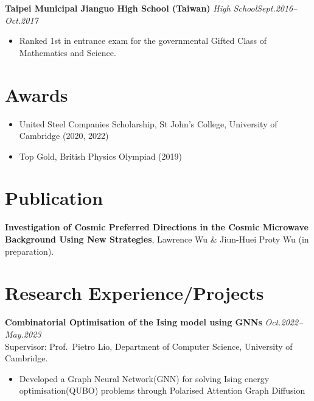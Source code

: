 \documentclass[11pt,a4paper,roman]{moderncv}        %
\begin{document}
\textbf{Taipei Municipal Jianguo High School (Taiwan)} \textit{High School}\hfill \textit{Sept.2016--Oct.2017}
\vspace*{1mm}
\begin{itemize}
	\item{Ranked 1st in entrance exam for the governmental Gifted Class of Mathematics and Science.}
\end{itemize}

\section{Awards}
\begin{itemize}
	\item United Steel Companies Scholarship, St John's College, University of Cambridge (2020, 2022)
	\item Top Gold, British Physics Olympiad (2019)
\end{itemize}


\section{Publication}
\textbf{Investigation of Cosmic Preferred Directions in the Cosmic Microwave Background Using New Strategies}, Lawrence Wu \& Jiun-Huei Proty Wu (in preparation).

\section{Research Experience/Projects}

\textbf{Combinatorial Optimisation of the Ising model using GNNs} \hfill \textit{Oct.2022--May.2023}
\vspace*{1mm}\\
{Supervisor: Prof.\ Pietro Lio, Department of Computer Science, University of Cambridge.}
\vspace*{1mm}
\begin{itemize}
	\item Developed a Graph Neural Network(GNN) for solving Ising energy optimisation(QUBO) problems through Polarised Attention Graph Diffusion
\end{itemize}
\end{document}

